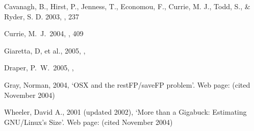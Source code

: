 \documentclass[11pt,twoside]{article}
\begin{document}
\begin{references}

  Cavanagh, B., Hirst, P., Jenness, T., Economou, F.,
Currie, M. J., Todd, S., \& Ryder, S. D. 2003, \adassxii, 237

 Currie, M.\ J.\ 2004, \adassxiii, 409

 Giaretta, D, et al., 2005, \adassxiv, 

 Draper, P.\ W.\ 2005, \adassxiv, 

 Gray, Norman, 2004, `OSX and the restFP/saveFP problem'.
Web page:
(cited November 2004)


 Wheeler, David A., 2001 (updated 2002), `More than a
Gigabuck: Estimating GNU/Linux's Size'.  Web page:
(cited November 2004)

\end{references}
\end{document}
